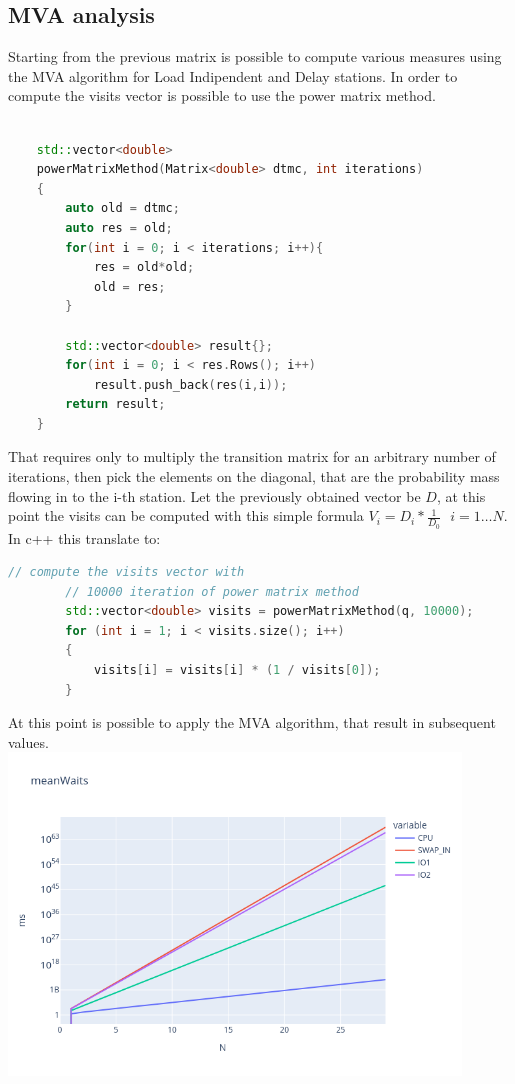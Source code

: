 \documentclass[12pt,a4paper]{article}
\begin{document}
    \subsection{MVA analysis}
    Starting from the previous matrix is possible to compute various measures using the MVA algorithm for Load Indipendent and Delay stations. In order to compute the visits vector is possible to use the power matrix method.
    \begin{lstlisting}[language=C++]
        
    std::vector<double> 
    powerMatrixMethod(Matrix<double> dtmc, int iterations)
    {
        auto old = dtmc;
        auto res = old;
        for(int i = 0; i < iterations; i++){
            res = old*old;
            old = res;
        }

        std::vector<double> result{};
        for(int i = 0; i < res.Rows(); i++)
            result.push_back(res(i,i));
        return result;
    }
    \end{lstlisting}
    That requires only to multiply the transition matrix for an arbitrary number of iterations, then pick the elements on the diagonal, that are the probability mass flowing in to the i-th station. Let the previously obtained vector be $D$, at this point the visits can be computed with this simple formula $V_i=D_i*\frac{1}{D_0} \ \ \ i=1 \dots N$. In c++ this translate to:
    \begin{lstlisting}[language=C++]
        // compute the visits vector with 
        // 10000 iteration of power matrix method
        std::vector<double> visits = powerMatrixMethod(q, 10000);
        for (int i = 1; i < visits.size(); i++)
        {
            visits[i] = visits[i] * (1 / visits[0]);
        }
    \end{lstlisting}
    At this point is possible to apply the MVA algorithm, that result in subsequent values.
    \\
    \includegraphics[width=0.9\textwidth]{Images/meanWaits.png}\\
\end{document}
